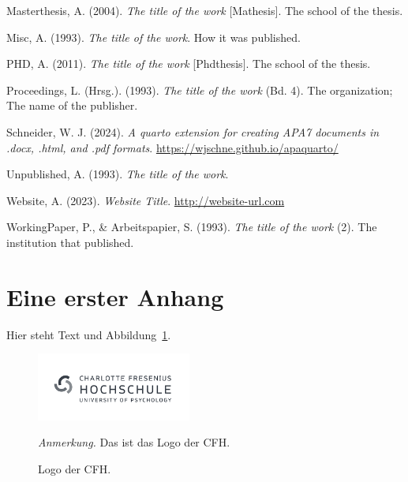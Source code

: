 \documentclass[
  stu,
  floatsintext,
  longtable,
  a4paper,
  nolmodern,
  notxfonts,
  notimes,
  donotrepeattitle,
  colorlinks=true,linkcolor=blue,citecolor=blue,urlcolor=blue]{apa7}
\newlength{\cslhangindent}
\newenvironment{CSLReferences}[2] %
 {\begin{list}{}{%
  \setlength{\itemindent}{0pt}
  \setlength{\leftmargin}{0pt}
  \setlength{\parsep}{0pt}
  \ifodd #1
   \setlength{\leftmargin}{\cslhangindent}
   \setlength{\itemindent}{-1\cslhangindent}
  \fi
  \setlength{\itemsep}{#2\baselineskip}}}
 {\end{list}}
\begin{document}
\begin{CSLReferences}{1}{0}
Masterthesis, A. (2004). \emph{The title of the work} {[}Mathesis{]}.
The school of the thesis.

Misc, A. (1993). \emph{The title of the work}. How it was published.

PHD, A. (2011). \emph{The title of the work} {[}Phdthesis{]}. The school
of the thesis.

Proceedings, L. (Hrsg.). (1993). \emph{The title of the work} (Bd. 4).
The organization; The name of the publisher.

Schneider, W. J. (2024). \emph{A quarto extension for creating APA7
documents in .docx, .html, and .pdf formats}.
\url{https://wjschne.github.io/apaquarto/}

Unpublished, A. (1993). \emph{The title of the work}.

Website, A. (2023). \emph{Website Title}. \url{http://website-url.com}

WorkingPaper, P., \& Arbeitspapier, S. (1993). \emph{The title of the
work} (2). The institution that published.

\end{CSLReferences}

\newpage
\appendix

\section{Eine erster Anhang}\label{eine-erster-anhang}

Hier steht Text und Abbildung~\ref{fig-logo4}.

\begin{figure}[h]

{\caption{{Logo der CFH.}{\label{fig-logo4}}}}

\includegraphics[width=2in,height=\textheight]{logo.png}

{\noindent \emph{Anmerkung.} Das ist das Logo der CFH.}

\end{figure}
\end{document}
